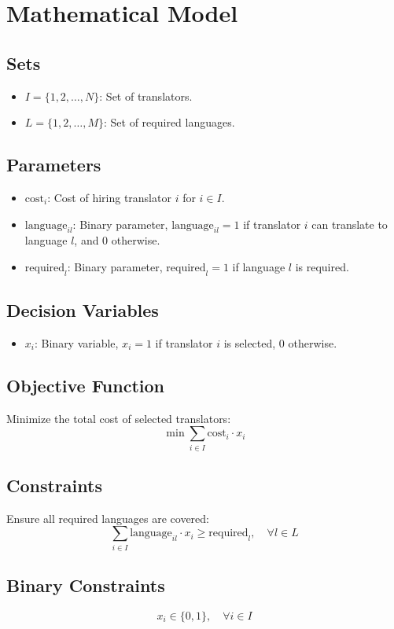 \documentclass{article}
\begin{document}
\section*{Mathematical Model}

\subsection*{Sets}
\begin{itemize}
    \item \( I = \{1, 2, \ldots, N\} \): Set of translators.
    \item \( L = \{1, 2, \ldots, M\} \): Set of required languages.
\end{itemize}

\subsection*{Parameters}
\begin{itemize}
    \item \( \text{cost}_i \): Cost of hiring translator \( i \) for \( i \in I \).
    \item \( \text{language}_{il} \): Binary parameter, \( \text{language}_{il} = 1 \) if translator \( i \) can translate to language \( l \), and 0 otherwise.
    \item \( \text{required}_l \): Binary parameter, \( \text{required}_l = 1 \) if language \( l \) is required.
\end{itemize}

\subsection*{Decision Variables}
\begin{itemize}
    \item \( x_i \): Binary variable, \( x_i = 1 \) if translator \( i \) is selected, 0 otherwise.
\end{itemize}

\subsection*{Objective Function}
Minimize the total cost of selected translators:
\[
\min \sum_{i \in I} \text{cost}_i \cdot x_i
\]

\subsection*{Constraints}
Ensure all required languages are covered:
\[
\sum_{i \in I} \text{language}_{il} \cdot x_i \geq \text{required}_l, \quad \forall l \in L
\]

\subsection*{Binary Constraints}
\[
x_i \in \{0, 1\}, \quad \forall i \in I
\]
\end{document}
